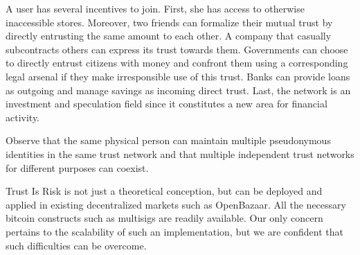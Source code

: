   A user has several incentives to join. First, she has access to otherwise inaccessible stores. Moreover, two friends can
  formalize their mutual trust by directly entrusting the same amount to each other. A company that casually subcontracts
  others can express its trust towards them. Governments can choose to directly entrust citizens with money and confront them
  using a corresponding legal arsenal if they make irresponsible use of this trust. Banks can provide loans as outgoing and
  manage savings as incoming direct trust. Last, the network is an investment and speculation field since it constitutes a new
  area for financial activity.

  Observe that the same physical person can maintain multiple pseudonymous identities in the same trust network and that
  multiple independent trust networks for different purposes can coexist.

  Trust Is Risk is not just a theoretical conception, but can be deployed and applied in existing decentralized markets such
  as OpenBazaar. All the necessary bitcoin constructs such as multisigs are readily available. Our only concern pertains to
  the scalability of such an implementation, but we are confident that such difficulties can be overcome.
